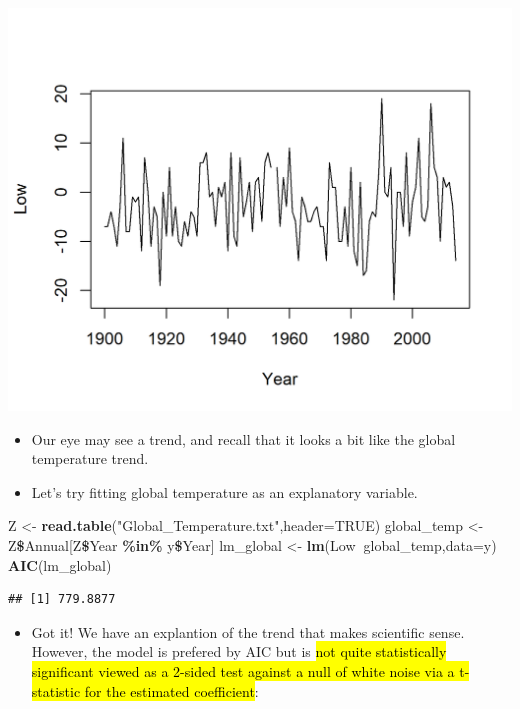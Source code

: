 \documentclass[]{article}
\newenvironment{Shaded}{\begin{snugshade}}{\end{snugshade}}
\newcommand{\KeywordTok}[1]{\textcolor[rgb]{0.13,0.29,0.53}{\textbf{#1}}}
\newcommand{\DataTypeTok}[1]{\textcolor[rgb]{0.13,0.29,0.53}{#1}}
\newcommand{\StringTok}[1]{\textcolor[rgb]{0.31,0.60,0.02}{#1}}
\newcommand{\OtherTok}[1]{\textcolor[rgb]{0.56,0.35,0.01}{#1}}
\newcommand{\OperatorTok}[1]{\textcolor[rgb]{0.81,0.36,0.00}{\textbf{#1}}}
\newcommand{\NormalTok}[1]{#1}
\providecommand{\tightlist}{%
  \setlength{\itemsep}{0pt}\setlength{\parskip}{0pt}}
\begin{document}
\begin{center}\includegraphics{figure/intro-plot_jan_temp-1} \end{center}

\begin{itemize}
\item
  Our eye may see a trend, and recall that it looks a bit like the
  global temperature trend.
\item
  Let's try fitting global temperature as an explanatory variable.
\end{itemize}

\begin{Shaded}
\begin{Highlighting}[]
\NormalTok{Z <-}\StringTok{ }\KeywordTok{read.table}\NormalTok{(}\StringTok{"Global_Temperature.txt"}\NormalTok{,}\DataTypeTok{header=}\OtherTok{TRUE}\NormalTok{)}
\NormalTok{global_temp <-}\StringTok{ }\NormalTok{Z}\OperatorTok{\$}\NormalTok{Annual[Z}\OperatorTok{\$}\NormalTok{Year }\OperatorTok{\%in\%}\StringTok{ }\NormalTok{y}\OperatorTok{\$}\NormalTok{Year]}
\NormalTok{lm_global <-}\StringTok{ }\KeywordTok{lm}\NormalTok{(Low}\OperatorTok{~}\NormalTok{global_temp,}\DataTypeTok{data=}\NormalTok{y)}
\KeywordTok{AIC}\NormalTok{(lm_global)}
\end{Highlighting}
\end{Shaded}

\begin{verbatim}
## [1] 779.8877
\end{verbatim}

\begin{itemize}
\tightlist
\item
  Got it! We have an explantion of the trend that makes scientific
  sense. However, the model is prefered by AIC but is \hl{not quite
  statistically significant viewed as a 2-sided test against a null of
  white noise via a t-statistic for the estimated coefficient}:
\end{itemize}
\end{document}
